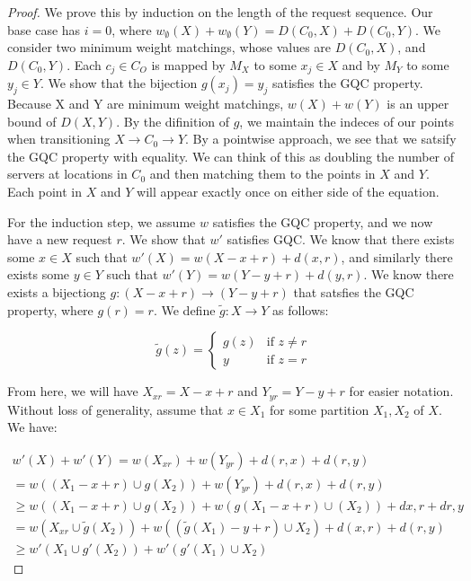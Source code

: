 \begin{proof}
    We prove this by induction on the length of the request sequence. Our base case has $i = 0$, where $w_{\emptyset}(X) + w_{\emptyset}(Y) = D(C_0, X) + D(C_0, Y)$. We consider two minimum weight matchings, whose values are $D(C_0, X)$, and $D(C_0, Y)$. Each $c_j \in C_O$ is mapped by $M_X$ to some $x_j \in X$ and by $M_Y$ to some $y_j \in Y$. We show that the bijection $g(x_j) = y_j$ satisfies the GQC property. Because X and Y are minimum weight matchings, $w(X) + w(Y)$ is an upper bound of $D(X, Y)$. By the difinition of $g$, we maintain the indeces of our points when transitioning $X \rightarrow C_0 \rightarrow Y$. By a pointwise approach, we see that we satsify the GQC property with equality. We can think of this as doubling the number of servers at locations in $C_0$ and then matching them to the points in $X$ and $Y$. Each point in $X$ and $Y$ will appear exactly once on either side of the equation.

    For the induction step, we assume $w$ satisfies the GQC property, and we now have a new request $r$. We show that $w'$ satisfies GQC. We know that there exists some $x \in X$ such that $w'(X) = w(X-x+r) + d(x,r)$, and similarly there exists some $y \in Y$ such that $w'(Y) = w(Y-y+r) + d(y,r)$. We know there exists a bijectiong $g: (X-x+r) \rightarrow (Y-y+r)$ that satsfies the GQC property, where $g(r) = r$. We define $\tilde{g}: X \rightarrow Y$ as follows:

    \begin{equation*}
        \tilde{g}(z) = \begin{cases}
            g(z) & \text{if } z \neq r \\
            y & \text{if } z = r
        \end{cases}
    \end{equation*}

    From here, we will have $X_{xr} = X - x + r$ and $Y_{yr} = Y - y + r$ for easier notation. Without loss of generality, assume that $x \in X_1$ for some partition $X_1, X_2$ of $X$. We have:

    \begin{equation*}
        \begin{gathered}
            w'(X) + w'(Y) = w(X_{xr}) + w(Y_{yr}) + d(r, x) + d(r, y) \\
            = w( (X_1-x+r) \cup g(X_2)) + w(Y_{yr}) + d(r, x) + d(r, y) \\
            \geq w((X_1-x+r) \cup g(X_2)) + w(g(X_1-x+r) \cup (X_2)) + d{x, r} + d{r, y} \\
            = w(X_{xr} \cup \tilde{g}(X_2)) + w((\tilde{g}(X_1) -y + r) \cup X_2) + d(x, r) + d(r, y) \\
            \geq w'(X_1 \cup g'(X_2)) + w'(g'(X_1) \cup X_2) 
        \end{gathered}
    \end{equation*}
\end{proof}


